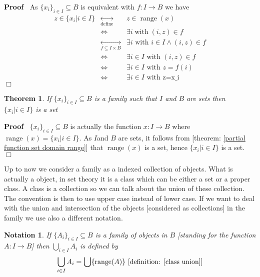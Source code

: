 \documentclass{book}
\newcommand{\Leftrightarrowlim}{\mathop{\leftrightarrow}\limits}
\newcommand{\tmop}[1]{\ensuremath{\operatorname{#1}}}
\newenvironment{proof}{\noindent\textbf{Proof\ }}{\hspace*{\fill}$\Box$\medskip}
\newtheorem{notation}{Notation}
{\theorembodyfont{\rmfamily}\newtheorem{note}{Note}}
\newtheorem{theorem}{Theorem}
\begin{document}
\begin{proof}
  As $\{ x_i \}_{i \in I} \subseteq B$ is equivalent with $f : I \rightarrow
  B$ we have
  \begin{eqnarray*}
    z \in \{ x_i |i \in I \} & \Leftrightarrowlim_{\tmop{define}} & z \in
    \tmop{range} (x)\\
    & \Leftrightarrow & \exists i \tmop{with} (i, z) \in f\\
    & \Leftrightarrowlim_{f \subseteq I \times B} & \exists i \text{ with $i
    \in I \wedge (i, z) \in f$}\\
    & \Leftrightarrow & \exists i \in I \text{ with } (i, z) \in f\\
    & \Leftrightarrow & \exists i \in I \text{ with } z = f (i)\\
    & \Leftrightarrow & \exists i \in I \text{ with z=x\_i}
  \end{eqnarray*}
\end{proof}

\begin{theorem}
  \label{family set}If $\{ x_i \}_{i \in I} \subseteq B$ is a family such that
  $I$ and $B$ are sets then $\{ x_i |i \in I \}$ is a set
\end{theorem}

\begin{proof}
  $\{ x_i \}_{i \in I} \subseteq B$ is actually the function $x : I
  \rightarrow B$ where $\tmop{range} (x) = \{ x_i |i \in I \}$. As $I$and $B$
  are sets, it follows from [theorem: \ref{partial function set domain range}]
  that $\tmop{range} (x)$ is a set, hence $\{ x_i |i \in I \}$ is a set.
\end{proof}

Up to now we consider a family as a indexed collection of objects. What is
actually a object, in set theory it is a class which can be either a set or a
proper class. A class is a collection so we can talk about the union of these
collection. The convention is then to use upper case instead of lower case. If
we want to deal with the union and intersection of the objects [considered as
collections] in the family we use also a different notation.

\begin{notation}
  \label{family union (1)}If $\{ A_i \}_{i \in I} \subseteq B$ is a family of
  objects in $B$ [standing for the function $A : I \rightarrow B$] then
  $\bigcup_{i \in I} A_i$ is defined by
  \[ \bigcup_{i \in I} A_i = \bigcup \{ \tmop{range} (A) \} \text{
     [definition: \ref{class union}]} \]
\end{notation}
\end{document}
